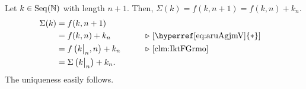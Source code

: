 \documentclass[../introduction_to_set_theory.tex]{subfiles}
\begin{document}
{    Let \(k \in \Seq(\NN)\) with length \(n + 1\).
    Then, \(\Sigma(k) = f(k, n+1) = f(k, n) + k_n\).
    \begin{alignat*}{2}
        \Sigma(k) &= f(k, n+1) \\
                  &= f(k, n) + k_n &\qquad& \comment*{[\hyperref[eq:aruAgjmV]{\(\ast\)}]}\\
                  &= f\left(\restr{k}{n}, n\right) + k_n && \comment*{\Cref{clm:IktFGrmo}} \\
                  &= \Sigma \left(\restr{k}{n}\right) + k_n.
    \end{alignat*}
    The uniqueness easily follows.
}


%


\end{document}
